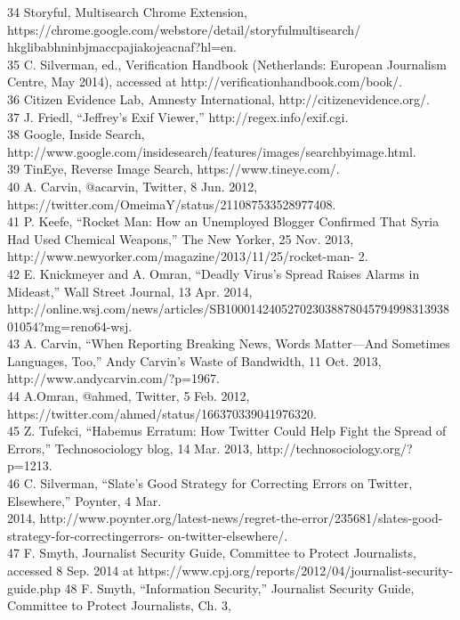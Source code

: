 34 Storyful, Multisearch Chrome Extension, https://chrome.google.com/webstore/detail/storyfulmultisearch/
hkglibabhninbjmaccpajiakojeacnaf?hl=en.\\
35 C. Silverman, ed., Verification Handbook (Netherlands: European Journalism Centre, May 2014),
accessed at http://verificationhandbook.com/book/.\\
36 Citizen Evidence Lab, Amnesty International, http://citizenevidence.org/.\\
37 J. Friedl, ``Jeffrey’s Exif Viewer,'' http://regex.info/exif.cgi.\\
38 Google, Inside Search, http://www.google.com/insidesearch/features/images/searchbyimage.html.\\
39 TinEye, Reverse Image Search, https://www.tineye.com/.\\
40 A. Carvin, @acarvin, Twitter, 8 Jun. 2012, https://twitter.com/OmeimaY/status/211087533528977408.\\
41 P. Keefe, ``Rocket Man: How an Unemployed Blogger Confirmed That Syria Had Used Chemical
Weapons,'' The New Yorker, 25 Nov. 2013, http://www.newyorker.com/magazine/2013/11/25/rocket-man-
2.\\
42 E. Knickmeyer and A. Omran, ``Deadly Virus’s Spread Raises Alarms in Mideast,'' Wall Street Journal,
13 Apr. 2014,
http://online.wsj.com/news/articles/SB10001424052702303887804579499831393801054?mg=reno64-wsj.\\
43 A. Carvin, ``When Reporting Breaking News, Words Matter—And Sometimes Languages, Too,'' Andy
Carvin’s Waste of Bandwidth, 11 Oct. 2013, http://www.andycarvin.com/?p=1967.\\
44 A.Omran, @ahmed, Twitter, 5 Feb. 2012, https://twitter.com/ahmed/status/166370339041976320.\\
45 Z. Tufekci, ``Habemus Erratum: How Twitter Could Help Fight the Spread of Errors,'' Technosociology
blog, 14 Mar. 2013, http://technosociology.org/?p=1213.\\
46 C. Silverman, ``Slate’s Good Strategy for Correcting Errors on Twitter, Elsewhere,'' Poynter, 4 Mar.\\
2014, http://www.poynter.org/latest-news/regret-the-error/235681/slates-good-strategy-for-correctingerrors-
on-twitter-elsewhere/.\\
47 F. Smyth, Journalist Security Guide, Committee to Protect Journalists, accessed 8 Sep. 2014 at
https://www.cpj.org/reports/2012/04/journalist-security-guide.php
48 F. Smyth, ``Information Security,'' Journalist Security Guide, Committee to Protect Journalists, Ch. 3,
